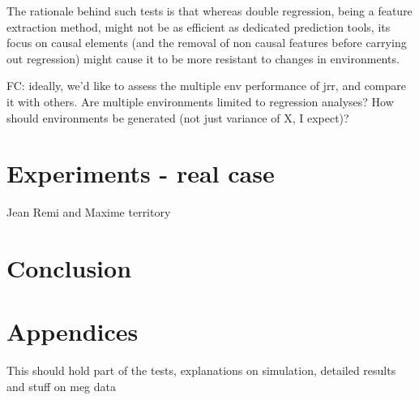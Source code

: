 \documentclass{article}
\begin{document}
The rationale behind such tests is that whereas double regression, being a feature extraction method, might not be as efficient as dedicated prediction tools, its focus on causal elements (and the removal of non causal features before carrying out regression) might cause it to be more resistant to changes in environments. 

FC: ideally, we'd like to assess the multiple env performance of jrr, and compare it with others. Are multiple environments limited to regression analyses? How should environments be generated (not just variance of X, I expect)?


\section{Experiments - real case}
Jean Remi and Maxime territory

\section{Conclusion}


\clearpage
\newpage




\section{Appendices}

This should hold part of the tests, explanations on simulation, detailed results and stuff on meg data
\end{document}
